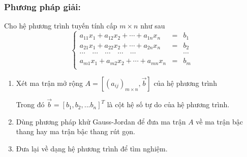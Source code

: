 \documentclass[12pt,a4paper,oneside]{book}
\theoremstyle{theorem}
\theoremstyle{definition}
\begin{document}
\subsubsection{Phương pháp giải:}
Cho hệ phương trình tuyến tính cấp $m \times n$ như sau
\begin{equation} 
\left\{
\begin{array}{lcl}
a_{11}x_1 + a_{12}x_2 + \cdots + a_{1n}x_n &=& b_1 \\
a_{21}x_1 + a_{22}x_2 + \cdots + a_{2n}x_n &=& b_2 \\
\cdots \quad \cdots \quad \cdots \quad \cdots \quad \cdots && \cdots \\
a_{m1}x_1 + a_{m2}x_2 + \cdots + a_{mn}x_n &=& b_m \\
\end{array}
\right.
\end{equation}
\begin{enumerate}
    \item Xét ma trận mở rộng $A=[(a_{ij})_{m \times n},\vec{b}]$ của hệ phương trình 
    
    Trong đó $\vec{b}=[b_1,b_2,...b_n]^T$ là cột hệ số tự do của hệ phương trình.
    \item Dùng phương pháp khử Gauss-Jordan để đưa ma trận $A$ về ma trận bậc thang hay ma trận bậc thang rút gọn.
    \item Đưa lại về dạng hệ phương trình để tìm nghiệm.
\end{enumerate}
\end{document}
